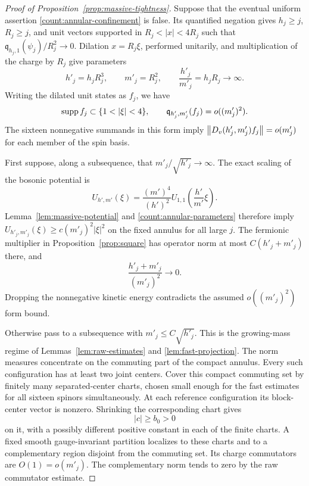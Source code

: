\begin{proof}[Proof of Proposition~\ref{prop:massive-tightness}]
Suppose that the eventual uniform assertion
\eqref{count:annular-confinement} is false. Its quantified negation gives
\(h_j\ge j\), \(R_j\ge j\), and unit vectors supported in
\(R_j<|x|<4R_j\) such that
\(\mathfrak q_{h_j,1}(\psi_j)/R_j^2\to0\). Dilation \(x=R_j\xi\),
performed unitarily, and multiplication of the charge by \(R_j\) give
parameters
\begin{equation}\label{count:annular-parameters}
 h'_j=h_jR_j^3,\qquad m'_j=R_j^2,\qquad
 \frac{h'_j}{m'_j}=h_jR_j\longrightarrow\infty.
\end{equation}
Writing the dilated unit states as \(f_j\), we have
\[
 \supp f_j\subset\{1<|\xi|<4\},\qquad
 \mathfrak q_{h'_j,m'_j}(f_j)=o((m'_j)^2).
\]
The sixteen nonnegative summands in this form imply
\(\left\lVert D_v(h'_j,m'_j)f_j\right\rVert=o(m'_j)\) for each member of the spin basis.

First suppose, along a subsequence, that
\(m'_j/\sqrt{h'_j}\to\infty\). The exact scaling of the bosonic potential
is
\begin{equation}\label{count:potential-scaling}
 U_{h',m'}(\xi)=\frac{(m')^4}{(h')^2}
                    U_{1,1}\left(\frac{h'}{m'}\xi\right).
\end{equation}
Lemma~\ref{lem:massive-potential} and \eqref{count:annular-parameters}
therefore imply
\(U_{h'_j,m'_j}(\xi)\ge c(m'_j)^2|\xi|^2\) on the fixed annulus for all
large \(j\). The fermionic multiplier in Proposition~\ref{prop:square}
has operator norm at most \(C(h'_j+m'_j)\) there, and
\[
 \frac{h'_j+m'_j}{(m'_j)^2}\longrightarrow0.
\]
Dropping the nonnegative kinetic energy contradicts the assumed
\(o((m'_j)^2)\) form bound.

Otherwise pass to a subsequence with \(m'_j\le C\sqrt{h'_j}\). This is
the growing-mass regime of Lemmas~\ref{lem:raw-estimates} and
\ref{lem:fast-projection}. The norm measures concentrate on the commuting
part of the compact annulus. Every such configuration has at least two
joint centers. Cover this compact commuting set by finitely many
separated-center charts, chosen small enough for the fast estimates for
all sixteen spinors simultaneously. At each reference configuration its
block-center vector is nonzero. Shrinking the corresponding chart gives
\begin{equation}\label{count:center-away-zero}
                     |c|\ge b_0>0
\end{equation}
on it, with a possibly different positive constant in each of the finite
charts. A fixed smooth gauge-invariant partition localizes to these
charts and to a complementary region disjoint from the commuting set.
Its charge commutators are \(O(1)=o(m'_j)\). The complementary norm tends
to zero by the raw commutator estimate.


\end{proof}
